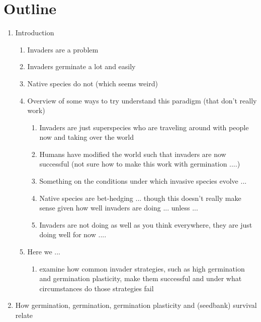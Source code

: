 \documentclass[11pt]{article}
\begin{document}
\section{Outline}
\begin{enumerate}
\item Introduction 
\begin{enumerate}
\item Invaders are a problem 
\item Invaders germinate a lot and easily 
\item Native species do not (which seems weird) 
\item Overview of some ways to try understand this paradigm (that don't really work) 
\begin{enumerate}
\item Invaders are just superspecies who are traveling around with people now and taking over the world
\item Humans have modified the world such that invaders are now successful (not sure how to make this work with germination ....)
\item Something on the conditions under which invasive species evolve ... 
\item Native species are bet-hedging ... though this doesn't really make sense given how well invaders are doing ... unless ...
\item Invaders are not doing as well as you think everywhere, they are just doing well for now .... 
\end{enumerate}
\item Here we ...
\begin{enumerate}
\item examine how common invader strategies, such as high germination and germination plasticity, make them successful and under what circumstances do those strategies fail 
\end{enumerate}
\end{enumerate}
\item How germination, germination, germination plasticity and (seedbank) survival relate

\end{enumerate}
\end{document}
